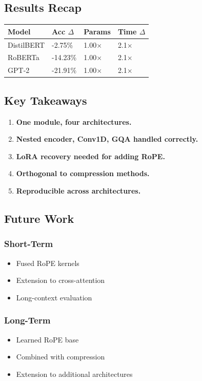 \subsection{Results Recap}

\begin{table}[H]
\centering
\small
\begin{tabular}{llll}
\toprule
\textbf{Model} & \textbf{Acc $\Delta$} & \textbf{Params} & \textbf{Time $\Delta$} \\
\midrule
DistilBERT & -2.75\% & 1.00$\times$ & 2.1$\times$ \\
RoBERTa & -14.23\% & 1.00$\times$ & 2.1$\times$ \\
GPT-2 & -21.91\% & 1.00$\times$ & 2.1$\times$ \\
\bottomrule
\end{tabular}
\end{table}

\subsection{Key Takeaways}

\begin{enumerate}
\item \textbf{One module, four architectures.}
\item \textbf{Nested encoder, Conv1D, GQA handled correctly.}
\item \textbf{LoRA recovery needed for adding RoPE.}
\item \textbf{Orthogonal to compression methods.}
\item \textbf{Reproducible across architectures.}

\end{enumerate}
\subsection{Future Work}

\subsubsection{Short-Term}
\begin{itemize}
\item Fused RoPE kernels
\item Extension to cross-attention
\item Long-context evaluation

\end{itemize}
\subsubsection{Long-Term}
\begin{itemize}
\item Learned RoPE base
\item Combined with compression
\item Extension to additional architectures

\end{itemize}
